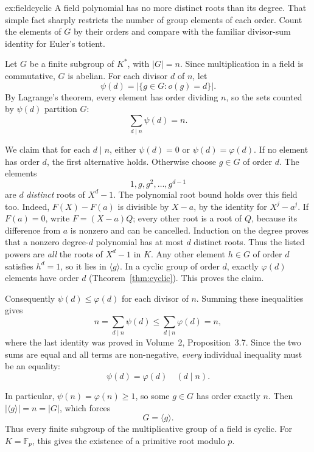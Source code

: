 \begin{solution}{ex:fieldcyclic}
\idea A field polynomial has no more distinct roots than its degree. That simple fact sharply restricts the number of group elements of each order. Count the elements of $G$ by their orders and compare with the familiar divisor-sum identity for Euler's totient.

\writeup Let $G$ be a finite subgroup of $K^*$, with $|G|=n$. Since multiplication in a field is commutative, $G$ is abelian. For each divisor $d$ of $n$, let
\[
\psi(d)=|\{g\in G:o(g)=d\}|.
\]
By Lagrange's theorem, every element has order dividing $n$, so the sets counted by $\psi(d)$ partition $G$:
\[
\sum_{d\mid n}\psi(d)=n.
\]

We claim that for each $d\mid n$, either $\psi(d)=0$ or $\psi(d)=\varphi(d)$. If no element has order $d$, the first alternative holds. Otherwise choose $g\in G$ of order $d$. The elements
\[
1,g,g^2,\ldots,g^{d-1}
\]
are $d$ \emph{distinct} roots of $X^d-1$. The polynomial root bound holds over this field too. Indeed, $F(X)-F(a)$ is divisible by $X-a$, by the identity for $X^j-a^j$. If $F(a)=0$, write $F=(X-a)Q$; every other root is a root of $Q$, because its difference from $a$ is nonzero and can be cancelled. Induction on the degree proves that a nonzero degree-$d$ polynomial has at most $d$ distinct roots. Thus the listed powers are \emph{all} the roots of $X^d-1$ in $K$. Any other element $h\in G$ of order $d$ satisfies $h^d=1$, so it lies in $\langle g\rangle$. In a cyclic group of order $d$, exactly $\varphi(d)$ elements have order $d$ (Theorem~\ref{thm:cyclic}). This proves the claim.

Consequently $\psi(d)\le\varphi(d)$ for each divisor of $n$. Summing these inequalities gives
\[
n=\sum_{d\mid n}\psi(d)
\le\sum_{d\mid n}\varphi(d)=n,
\]
where the last identity was proved in Volume~2, Proposition~3.7. Since the two sums are equal and all terms are non-negative, \emph{every} individual inequality must be an equality:
\[
\psi(d)=\varphi(d)\quad(d\mid n).
\]

In particular, $\psi(n)=\varphi(n)\ge1$, so some $g\in G$ has order exactly $n$. Then $|\langle g\rangle|=n=|G|$, which forces
\[
\boxed{G=\langle g\rangle}.
\]
Thus every finite subgroup of the multiplicative group of a field is cyclic. For $K=\mathbb F_p$, this gives the existence of a primitive root modulo $p$.
\end{solution}

